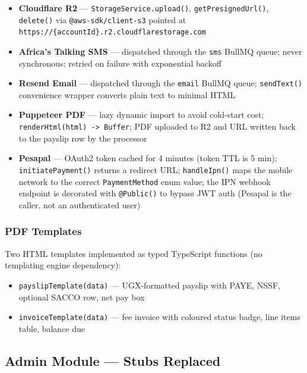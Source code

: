 \documentclass[11pt, a4paper]{article}
\newcommand{\code}[1]{\texttt{\small #1}}
\begin{document}
\begin{itemize}[leftmargin=1.5em, itemsep=2pt]
  \item \textbf{Cloudflare R2} --- \code{StorageService.upload()},
    \code{getPresignedUrl()}, \code{delete()} via \code{@aws-sdk/client-s3}
    pointed at \code{https://\{accountId\}.r2.cloudflarestorage.com}

  \item \textbf{Africa's Talking SMS} --- dispatched through the \code{sms}
    BullMQ queue; never synchronous; retried on failure with exponential backoff

  \item \textbf{Resend Email} --- dispatched through the \code{email} BullMQ queue;
    \code{sendText()} convenience wrapper converts plain text to minimal HTML

  \item \textbf{Puppeteer PDF} --- lazy dynamic import to avoid cold-start cost;
    \code{renderHtml(html) -> Buffer}; PDF uploaded to R2 and URL written back
    to the payslip row by the processor

  \item \textbf{Pesapal} --- OAuth2 token cached for 4 minutes (token TTL is 5 min);
    \code{initiatePayment()} returns a redirect URL; \code{handleIpn()} maps
    the mobile network to the correct \code{PaymentMethod} enum value;
    the IPN webhook endpoint is decorated with \code{@Public()} to bypass
    JWT auth (Pesapal is the caller, not an authenticated user)
\end{itemize}

\subsubsection*{PDF Templates}

Two HTML templates implemented as typed TypeScript functions (no templating
engine dependency):

\begin{itemize}[leftmargin=1.5em, itemsep=0pt]
  \item \code{payslipTemplate(data)} --- UGX-formatted payslip with PAYE,
    NSSF, optional SACCO row, net pay box
  \item \code{invoiceTemplate(data)} --- fee invoice with coloured status badge,
    line items table, balance due
\end{itemize}

\subsection{Admin Module --- Stubs Replaced}
\end{document}
